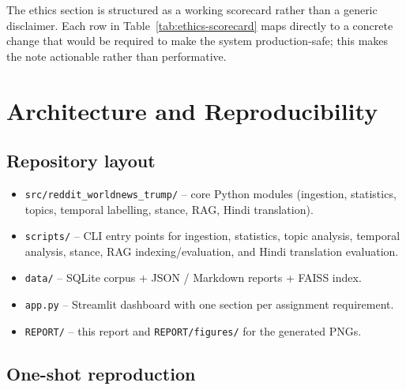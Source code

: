 \documentclass[11pt,a4paper]{article}
\newenvironment{extrabox}{%
  \par\medskip\noindent
  \def\FrameCommand{\fboxsep=6pt\fboxrule=0.6pt%
    \fcolorbox{extraboxrule}{extraboxbg}}%
  \MakeFramed{\advance\hsize-2\fboxsep\FrameRestore}%
  \noindent{\sffamily\bfseries\color{extraboxrule}Extra step.}\quad\ignorespaces%
}{\endMakeFramed\par\medskip}
\begin{document}
\begin{extrabox}
The ethics section is structured as a working scorecard rather than a generic disclaimer.
Each row in Table~\ref{tab:ethics-scorecard} maps directly to a concrete change that would be
required to make the system production-safe; this makes the note actionable rather than
performative.
\end{extrabox}

\section{Architecture and Reproducibility}
\label{sec:arch}

\subsection{Repository layout}

\begin{itemize}
  \item \texttt{src/reddit\_worldnews\_trump/} -- core Python modules (ingestion, statistics,
        topics, temporal labelling, stance, RAG, Hindi translation).
  \item \texttt{scripts/} -- CLI entry points for ingestion, statistics, topic analysis,
        temporal analysis, stance, RAG indexing/evaluation, and Hindi translation evaluation.
  \item \texttt{data/} -- SQLite corpus + JSON / Markdown reports + FAISS index.
  \item \texttt{app.py} -- Streamlit dashboard with one section per assignment requirement.
  \item \texttt{REPORT/} -- this report and \texttt{REPORT/figures/} for the generated PNGs.
\end{itemize}

\subsection{One-shot reproduction}
\end{document}

